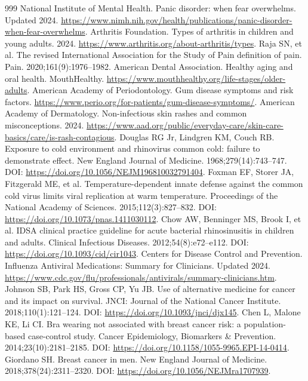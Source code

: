 \documentclass[11pt,oneside]{book}
\begin{document}
\begin{thebibliography}{999}
National Institute of Mental Health. Panic disorder: when fear overwhelms. Updated 2024. \url{https://www.nimh.nih.gov/health/publications/panic-disorder-when-fear-overwhelms}.
Arthritis Foundation. Types of arthritis in children and young adults. 2024. \url{https://www.arthritis.org/about-arthritis/types}.
Raja SN, et al. The revised International Association for the Study of Pain definition of pain. Pain. 2020;161(9):1976--1982.
American Dental Association. Healthy aging and oral health. MouthHealthy. \url{https://www.mouthhealthy.org/life-stages/older-adults}.
American Academy of Periodontology. Gum disease symptoms and risk factors. \url{https://www.perio.org/for-patients/gum-disease-symptoms/}.
American Academy of Dermatology. Non-infectious skin rashes and common misconceptions. 2024. \url{https://www.aad.org/public/everyday-care/skin-care-basics/care/is-rash-contagious}.
Douglas RG Jr, Lindgren KM, Couch RB. Exposure to cold environment and rhinovirus common cold: failure to demonstrate effect. New England Journal of Medicine. 1968;279(14):743--747. DOI: \url{https://doi.org/10.1056/NEJM196810032791404}.
Foxman EF, Storer JA, Fitzgerald ME, et al. Temperature-dependent innate defense against the common cold virus limits viral replication at warm temperature. Proceedings of the National Academy of Sciences. 2015;112(3):827--832. DOI: \url{https://doi.org/10.1073/pnas.1411030112}.
Chow AW, Benninger MS, Brook I, et al. IDSA clinical practice guideline for acute bacterial rhinosinusitis in children and adults. Clinical Infectious Diseases. 2012;54(8):e72--e112. DOI: \url{https://doi.org/10.1093/cid/cir1043}.
Centers for Disease Control and Prevention. Influenza Antiviral Medications: Summary for Clinicians. Updated 2024. \url{https://www.cdc.gov/flu/professionals/antivirals/summary-clinicians.htm}.
Johnson SB, Park HS, Gross CP, Yu JB. Use of alternative medicine for cancer and its impact on survival. JNCI: Journal of the National Cancer Institute. 2018;110(1):121--124. DOI: \url{https://doi.org/10.1093/jnci/djx145}.
Chen L, Malone KE, Li CI. Bra wearing not associated with breast cancer risk: a population-based case-control study. Cancer Epidemiology, Biomarkers \& Prevention. 2014;23(10):2181--2185. DOI: \url{https://doi.org/10.1158/1055-9965.EPI-14-0414}.
Giordano SH. Breast cancer in men. New England Journal of Medicine. 2018;378(24):2311--2320. DOI: \url{https://doi.org/10.1056/NEJMra1707939}.

\end{thebibliography}
\end{document}
